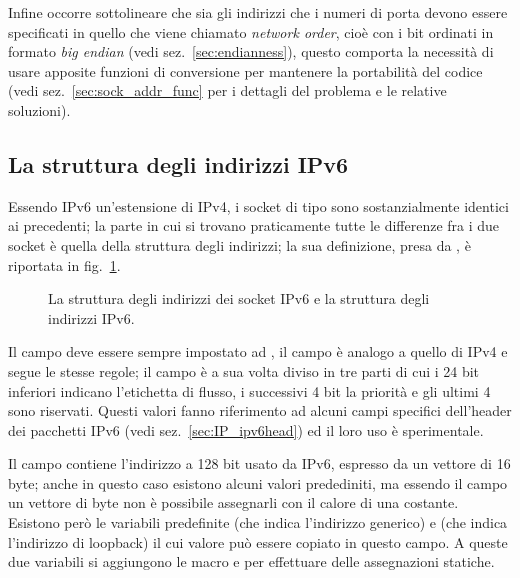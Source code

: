 Infine occorre sottolineare che sia gli indirizzi che i numeri di porta devono
essere specificati in quello che viene chiamato \textit{network order}, cioè
con i bit ordinati in formato \textit{big endian} (vedi
sez.~\ref{sec:endianness}), questo comporta la necessità di usare apposite
funzioni di conversione per mantenere la portabilità del codice (vedi
sez.~\ref{sec:sock_addr_func} per i dettagli del problema e le relative
soluzioni).


\subsection{La struttura degli indirizzi IPv6}
\label{sec:sock_sa_ipv6}

Essendo IPv6 un'estensione di IPv4, i socket di tipo  sono
sostanzialmente identici ai precedenti; la parte in cui si trovano
praticamente tutte le differenze fra i due socket è quella della struttura
degli indirizzi; la sua definizione, presa da , è
riportata in fig.~\ref{fig:sock_sa_ipv6_struct}.

\begin{figure}[!htb]
  \footnotesize \centering
  \begin{minipage}[c]{0.80\textwidth}
  \end{minipage} 
  \caption{La struttura  degli indirizzi dei socket
    IPv6 e la struttura  degli indirizzi IPv6.}
  \label{fig:sock_sa_ipv6_struct}
\end{figure}

Il campo  deve essere sempre impostato ad ,
il campo  è analogo a quello di IPv4 e segue le stesse regole;
il campo  è a sua volta diviso in tre parti di cui i 24
bit inferiori indicano l'etichetta di flusso, i successivi 4 bit la priorità e
gli ultimi 4 sono riservati. Questi valori fanno riferimento ad alcuni campi
specifici dell'header dei pacchetti IPv6 (vedi sez.~\ref{sec:IP_ipv6head}) ed
il loro uso è sperimentale.

Il campo  contiene l'indirizzo a 128 bit usato da IPv6,
espresso da un vettore di 16 byte; anche in questo caso esistono alcuni valori
predediniti, ma essendo il campo un vettore di byte non è possibile assegnarli
con il calore di una costante. Esistono però le variabili predefinite
 (che indica l'indirizzo generico) e 
(che indica l'indirizzo di loopback) il cui valore può essere copiato in
questo campo. A queste due variabili si aggiungono le macro
 e  per effettuare
delle assegnazioni statiche.

